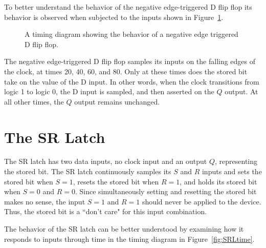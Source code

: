 To better understand the behavior of the negative edge-triggered 
D flip flop its behavior is observed when subjected to the inputs 
shown in Figure~\ref{fig:DFF}.

\begin{figure}[ht]
\caption{A timing diagram showing the behavior of a 
negative edge triggered D flip flop.}
\label{fig:DFF}
\end{figure}

The negative edge-triggered D flip flop samples its inputs on the
falling edges of the clock, at times 20, 40, 60, and 80.  Only
at these times does the stored bit take on the value of the 
D input.  In other words, when the clock transitions from logic 1 to
logic 0, the D input is sampled, and then asserted on the $Q$ output.
At all other times, the $Q$ output remains unchanged.

\section{The SR Latch}
The SR latch has two data inputs, no clock input and an output $Q$, 
representing the stored bit. The SR latch continuously samples
its $S$ and $R$ inputs and sets the stored bit when $S=1$, resets the
stored bit when $R=1$, and holds its stored bit when $S=0$ and $R=0$.
Since simultaneously setting and resetting the
stored bit makes no sense, the input $S=1$ and $R=1$ should never be applied to
the device.  Thus, the stored bit is a ``don't care" for this input
combination.

The behavior of the SR latch can be better understood
by examining how it responds to inputs through time in the 
timing diagram in Figure~\ref{fig:SRLtime}.

